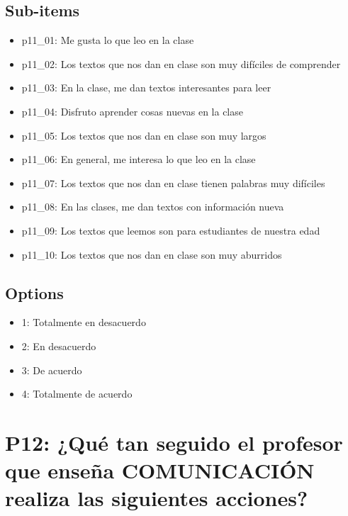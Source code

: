 \documentclass[11pt]{article}
\begin{document}
\subsection*{Sub-items}
\begin{itemize}[leftmargin=*]
  \item p11\_01: Me gusta lo que leo en la clase
  \item p11\_02: Los textos que nos dan en clase son muy difíciles de comprender
  \item p11\_03: En la clase, me dan textos interesantes para leer
  \item p11\_04: Disfruto aprender cosas nuevas en la clase
  \item p11\_05: Los textos que nos dan en clase son muy largos
  \item p11\_06: En general, me interesa lo que leo en la clase
  \item p11\_07: Los textos que nos dan en clase tienen palabras muy difíciles
  \item p11\_08: En las clases, me dan textos con información nueva
  \item p11\_09: Los textos que leemos son para estudiantes de nuestra edad
  \item p11\_10: Los textos que nos dan en clase son muy aburridos
\end{itemize}
\subsection*{Options}
\begin{itemize}[leftmargin=*]
  \item 1: Totalmente en desacuerdo
  \item 2: En desacuerdo
  \item 3: De acuerdo
  \item 4: Totalmente de acuerdo
\end{itemize}
\bigskip
\section*{P12: ¿Qué tan seguido el profesor que enseña COMUNICACIÓN realiza las siguientes acciones?}
\end{document}
